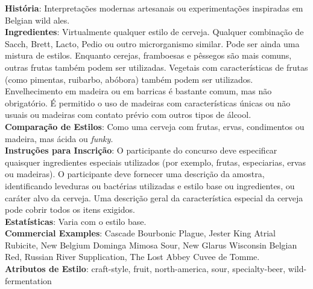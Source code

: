 \textbf{História}: Interpretações modernas artesanais ou experimentações inspiradas em Belgian wild ales. \\
\textbf{Ingredientes}: Virtualmente qualquer estilo de cerveja. Qualquer combinação de Sacch, Brett, Lacto, Pedio ou outro microrganismo similar. Pode ser ainda uma mistura de estilos. Enquanto cerejas, framboesas e pêssegos são mais comuns, outras frutas também podem ser utilizadas. Vegetais com características de frutas (como pimentas, ruibarbo, abóbora) também podem ser utilizados. Envelhecimento em madeira ou em barricas é bastante comum, mas não obrigatório. É permitido o uso de madeiras com características únicas ou não usuais ou madeiras com contato prévio com outros tipos de álcool. \\
\textbf{Comparação de Estilos}: Como uma cerveja com frutas, ervas, condimentos ou madeira, mas ácida ou \textit{funky}. \\
\textbf{Instruções para Inscrição}: O participante do concurso deve especificar quaisquer ingredientes especiais utilizados (por exemplo, frutas, especiarias, ervas ou madeiras). O participante deve fornecer uma descrição da amostra, identificando leveduras ou bactérias utilizadas e estilo base ou ingredientes, ou caráter alvo da cerveja. Uma descrição geral da característica especial da cerveja pode cobrir todos os itens exigidos. \\
\textbf{Estatísticas}: Varia com o estilo base. \\
\textbf{Commercial Examples}: Cascade Bourbonic Plague, Jester King Atrial Rubicite, New Belgium Dominga Mimosa Sour, New Glarus Wisconsin Belgian Red, Russian River Supplication, The Lost Abbey Cuvee de Tomme. \\
\textbf{Atributos de Estilo}: craft-style, fruit, north-america, sour, specialty-beer, wild-fermentation
